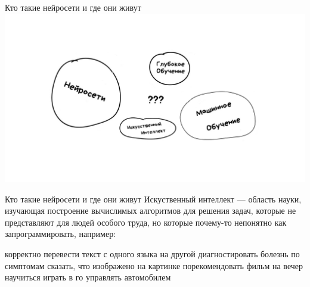 \documentclass[aspectratio=169, professionalfonts]{beamer}
\begin{document}
\begin{frame}{Кто такие нейросети и где они живут}
    \centering
    \includegraphics[width=.85\linewidth]{graphs/fig3.jpg}
\end{frame}

\begin{frame}{Кто такие нейросети и где они живут}
    Искуственный интеллект --- область науки, изучающая построение вычислимых алгоритмов для
    решения задач, которые не представляют для людей особого труда, но которые почему-то
    непонятно как запрограммировать, например:
    \begin{outline}
        \1 корректно перевести текст с одного языка на другой
        \1 диагностировать болезнь по симптомам
        \1 сказать, что изображено на картинке
        \1 порекомендовать фильм на вечер
        \1 научиться играть в го
        \1 управлять автомобилем
    \end{outline}
\end{frame}
\end{document}
